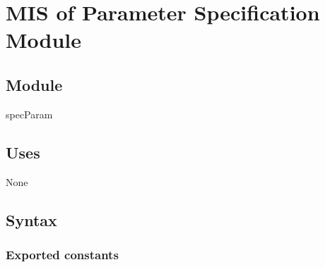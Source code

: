 \documentclass[12pt, titlepage]{article}
\begin{document}
\newpage

\section{MIS of Parameter Specification Module} \label{specParam}

\subsection{Module}

specParam

\subsection{Uses}

None

\subsection{Syntax}

\subsubsection{Exported constants}
\end{document}
